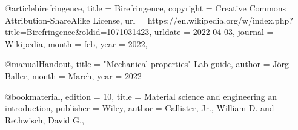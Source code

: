 @article{birefringence,
	title = {Birefringence},
	copyright = {Creative Commons Attribution-ShareAlike License},
	url = {https://en.wikipedia.org/w/index.php?title=Birefringence&oldid=1071031423},
	urldate = {2022-04-03},
	journal = {Wikipedia},
	month = feb,
	year = {2022},
}

@manual{Handout,
    title = {"Mechanical properties" Lab guide},
    author = {Jörg Baller},
    month = March,
    year = {2022}
}

@book{material,
	edition = {10},
	title = {Material science and engineering an introduction},
	publisher = {Wiley},
	author = {Callister, Jr., William D. and Rethwisch, David G.},
}